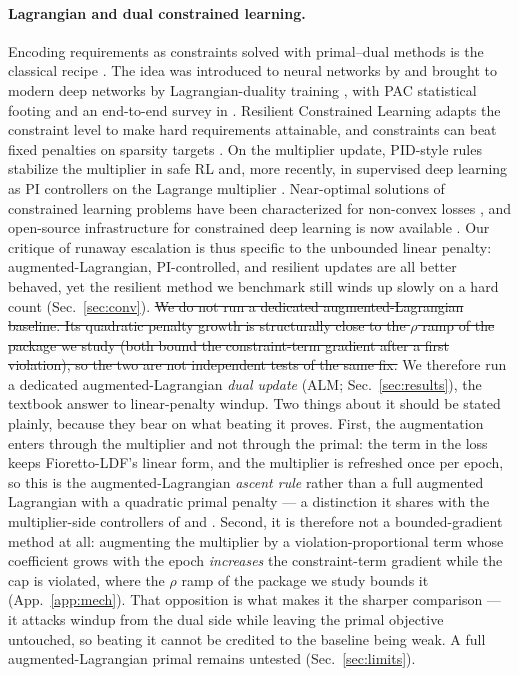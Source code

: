\documentclass[10pt]{article}
\newcommand{\del}[1]{{\color{red}\sout{#1}}}
\begin{document}
\paragraph{Lagrangian and dual constrained learning.}
Encoding requirements as constraints solved with primal--dual methods is
the classical recipe \citep{bertsekas1982constrained}. The idea was
introduced to neural networks by \citet{platt1988constrained} and brought
to modern deep networks by Lagrangian-duality training
\citep{fioretto2020lagrangian}, with PAC statistical footing
\citep{chamon2020probably,chamon2022constrained} and an end-to-end survey
in \citet{kotary2021end}. Resilient Constrained Learning
\citep{hounie2023resilient} adapts the constraint level to make hard
requirements attainable, and constraints can beat fixed penalties on
sparsity targets \citep{gallego2022controlled}. On the multiplier update,
PID-style rules stabilize the multiplier in safe RL
\citep{stooke2020responsive} and, more recently, in supervised deep
learning as PI controllers on the Lagrange multiplier
\citep{sohrabi2024pi}. Near-optimal solutions of constrained learning
problems have been characterized for non-convex losses
\citep{elenter2024near}, and open-source infrastructure for constrained
deep learning is now available \citep{gallego2024cooper}. Our critique of
runaway escalation is thus specific to the unbounded linear penalty:
augmented-Lagrangian, PI-controlled, and resilient updates are all better
behaved, yet the resilient method we benchmark still winds up slowly on a
hard count (Sec.~\ref{sec:conv}). \del{We do not run a dedicated
augmented-Lagrangian baseline. Its quadratic penalty growth is
structurally close to the $\rho$ ramp of the package we study (both bound
the constraint-term gradient after a first violation), so the two are not
independent tests of the same fix.}
{\color{blue}We therefore run a dedicated augmented-Lagrangian \emph{dual update}
(ALM; Sec.~\ref{sec:results}), the textbook answer to linear-penalty windup. Two
things about it should be stated plainly, because they bear on what beating it
proves. First, the augmentation enters through the multiplier and not through the
primal: the term in the loss keeps Fioretto-LDF's linear form, and the multiplier
is refreshed once per epoch, so this is the augmented-Lagrangian \emph{ascent
rule} rather than a full augmented Lagrangian with a quadratic primal penalty
\citep{bertsekas1982constrained} --- a distinction it shares with the
multiplier-side controllers of \citet{stooke2020responsive} and
\citet{sohrabi2024pi}. Second, it is therefore not a bounded-gradient method at
all: augmenting the multiplier by a violation-proportional term whose coefficient
grows with the epoch \emph{increases} the constraint-term gradient while the cap
is violated, where the $\rho$ ramp of the package we study bounds it
(App.~\ref{app:mech}). That opposition is what makes it the sharper comparison
--- it attacks windup from the dual side while leaving the primal objective
untouched, so beating it cannot be credited to the baseline being weak. A full
augmented-Lagrangian primal remains untested (Sec.~\ref{sec:limits}).}
\end{document}
